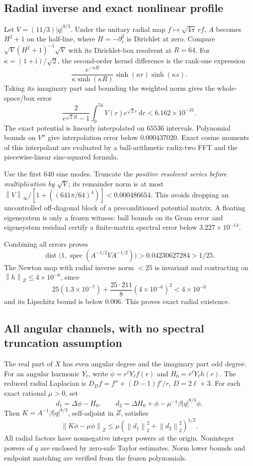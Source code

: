 \documentclass[11pt,a4paper]{article}
\theoremstyle{remark}\newtheorem{remark}[theorem]{Remark}
\newcommand{\ii}{\mathrm i}\newcommand{\dd}{\,\mathrm d}
\newcommand{\norm}[1]{\left\|#1\right\|}
\newcommand{\dist}{\operatorname{dist}}\newcommand{\spec}{\operatorname{spec}}
\begin{document}
\subsection{Radial inverse and exact nonlinear profile}
Let $V=(11/3)|q|^{8/3}$. Under the unitary radial map $f\mapsto\sqrt{4\pi}\,rf$, $A$ becomes $H^2+1$ on the half-line, where $H=-\partial_r^2$ is Dirichlet at zero. Compare
$\sqrt V(H^2+1)^{-1}\sqrt V$ with its Dirichlet-box resolvent at $R=64$.
For $\kappa=(1+\ii)/\sqrt2$, the second-order kernel difference is the rank-one expression
\[
 \frac{e^{-\kappa R}}{\kappa\sinh(\kappa R)}
       \sinh(\kappa r)\sinh(\kappa s).
\]
Taking its imaginary part and bounding the weighted norm gives the whole-space/box error
\[
 \frac{2}{e^{\sqrt2R}-1}\int_0^{54}V(r)e^{\sqrt2r}\dd r
 <6.162\times10^{-31}.
\]
The exact potential is linearly interpolated on $65536$ intervals. Polynomial bounds on $V''$ give interpolation error below $0.000437020$. Exact cosine moments of this interpolant are evaluated by a ball-arithmetic radix-two FFT and the piecewise-linear sinc-squared formula.

Use the first $640$ sine modes. Truncate the \emph{positive resolvent series before multiplication by $\sqrt V$}; its remainder norm is at most
$\norm V_\infty/[1+((641\pi/64)^4)]<0.000486654$. This avoids dropping an uncontrolled off-diagonal block of a preconditioned potential matrix. A floating eigensystem is only a frozen witness: ball bounds on its Gram error and eigensystem residual certify a finite-matrix spectral error below $3.227\times10^{-14}$.

Combining all errors proves
\[
 \dist\bigl(1,\spec(A^{-1/2}VA^{-1/2})\bigr)>0.04230627284>1/25.
\]
The Newton map with radial inverse norm $<25$ is invariant and contracting on $\norm{h}_Z\le4\times10^{-6}$, since
\[
 25(1.3\times10^{-7})+\frac{25\cdot211}{8}(4\times10^{-6})^2
 <4\times10^{-6}
\]
and its Lipschitz bound is below $0.006$. This proves exact radial existence.

\subsection{All angular channels, with no spectral truncation assumption}
The real part of $X$ has even angular degree and the imaginary part odd degree. For an angular harmonic $Y_\ell$, write
$\phi=r^\ell Y_\ell f(r)$ and $H_0=r^\ell Y_\ell h(r)$. The reduced radial Laplacian is $D_Df=f''+(D-1)f'/r$, $D=2\ell+3$. For each exact rational $\mu>0$, set
\[
 d_1=\Delta\phi-H_0,\qquad
 d_2=\Delta H_0+\phi-\mu^{-1}\beta|q|^{8/3}\phi.
\]
Then $K=A^{-1}\beta|q|^{8/3}$, self-adjoint in $Z$, satisfies
\[
 \norm{K\phi-\mu\phi}_Z
 \le\mu(\norm{d_1}_2^2+\norm{d_2}_2^2)^{1/2}.
\]
All radial factors have nonnegative integer powers at the origin. Noninteger powers of $q$ are enclosed by zero-safe Taylor estimates. Norm lower bounds and endpoint matching are verified from the frozen polynomials.
\end{document}
